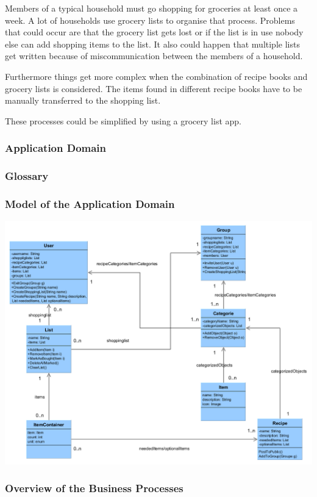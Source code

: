 \documentclass[12pt]{article}
\theoremstyle{definition}
\begin{document}
Members of a typical household must go shopping for groceries at least once a week. A lot of households use grocery lists to organise that process. Problems that could occur are that the grocery list gets lost or if the list is in use nobody else can add shopping items to the list. It also could happen that multiple lists get written because of miscommunication between the members of a household.

Furthermore things get more complex when the combination of recipe books and grocery lists is considered. The items found in different recipe books have to be manually transferred to the shopping list. 

These processes could be simplified by using a grocery list app.

\subsubsection{Application Domain}

\subsubsection{Glossary}

\subsubsection{Model of the Application Domain}

\includegraphics[scale=.65]{UMLClassDiagram.png}

\subsubsection{Overview of the Business Processes}
\end{document}
